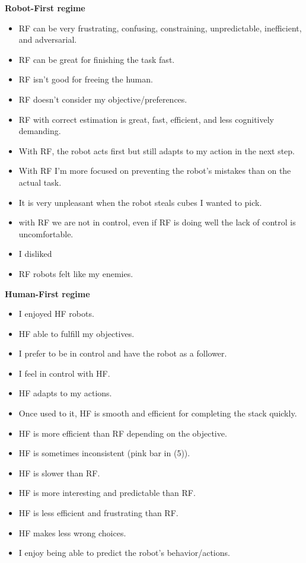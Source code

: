 \textbf{Robot-First regime}
\begin{itemize}
\setlength\itemsep{-0.3em}
\item RF can be very frustrating, confusing, constraining, unpredictable, inefficient, and adversarial.
\item RF can be great for finishing the task fast.
\item RF isn't good for freeing the human.
\item RF doesn't consider my objective/preferences.
\item RF with correct estimation is great, fast, efficient, and less cognitively demanding.
\item With RF, the robot acts first but still adapts to my action in the next step.
\item With RF I'm more focused on preventing the robot's mistakes than on the actual task.
\item It is very unpleasant when the robot steals cubes I wanted to pick.
\item with RF we are not in control, even if RF is doing well the lack of control is uncomfortable.
\item I disliked 
\item RF robots felt like my enemies.
\end{itemize}

\textbf{Human-First regime}
\begin{itemize}
\setlength\itemsep{-0.3em}
\item I enjoyed HF robots.
\item HF able to fulfill my objectives.
\item I prefer to be in control and have the robot as a follower.
\item I feel in control with HF.
\item HF adapts to my actions.

\item Once used to it, HF is smooth and efficient for completing the stack quickly.
\item HF is more efficient than RF depending on the objective.
\item HF is sometimes inconsistent (pink bar in (5)).
\item HF is slower than RF.
\item HF is more interesting and predictable than RF.
\item HF is less efficient and frustrating than RF.

\item HF makes less wrong choices.
\item I enjoy being able to predict the robot's behavior/actions.
\end{itemize}

